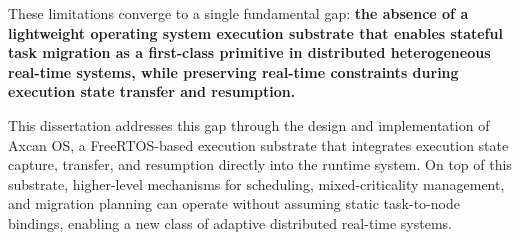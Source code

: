 \noindent
These limitations converge to a single fundamental gap: \textbf{the absence of a lightweight
	operating system execution substrate that enables stateful task migration as a first-class
	primitive in distributed heterogeneous real-time systems, while preserving real-time
	constraints during execution state transfer and resumption.}

This dissertation addresses this gap through the design and implementation of Axcan OS, a
FreeRTOS-based execution substrate that integrates execution state capture, transfer, and
resumption directly into the runtime system. On top of this substrate, higher-level
mechanisms for scheduling, mixed-criticality management, and migration planning can operate
without assuming static task-to-node bindings, enabling a new class of adaptive distributed
real-time systems.
%	
%	
%	
%	
%	
%	
%	
%	
%	
%	
%	
%	
